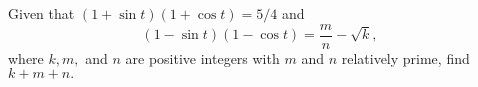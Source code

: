 Given that $(1+\sin t)(1+\cos t)=5/4$ and \[ (1-\sin t)(1-\cos t)=\frac mn-\sqrt{k}, \] where $k, m,$ and $n$ are positive integers with $m$ and $n$ relatively prime, find $k+m+n.$